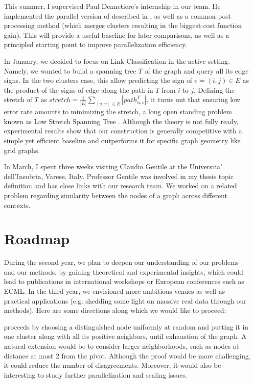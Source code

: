 This summer, I supervised Paul Dennetiere's internship in our team. He
implemented the parallel version of \kwik{} described in \autocite{Pan2014}, as
well as a common post processing method (which merges clusters resulting in the
biggest cost function gain). This will provide a useful baseline for later
comparisons, as well as a principled starting point to improve parallelization
efficiency.

\medskip

In January, we decided to focus on Link Classification in the active setting.
Namely, we wanted to build a spanning tree $T$ of the graph and query all its
edge signs. In the two clusters case, this allow predicting the sign of $e=(i,
j) \in E$ as the product of the signs of edge along the path in $T$ from $i$ to
$j$. Defining the stretch of $T$ as $stretch = \frac{1}{|E|} \sum_{(u,v) \in E}
|path^T_{u,v}|$, it turns out that ensuring low error rate amounts to
minimizing the stretch, a long open standing problem known as Low Stretch
Spanning Tree \autocite{Abraham2012}. Although the theory is not fully ready,
experimental results show that our construction is generally competitive with a
simple yet efficient baseline and outperforms it for specific graph geometry
like grid graphs.

In March, I spent three weeks visiting Claudio Gentile at the Universita'
dell'Insubria, Varese, Italy. Professor Gentile was involved in my thesis topic
definition and has close links with our research team. We worked on a related
problem regarding similarity between the nodes of a graph across different
contexts.

\section{Roadmap}\label{roadmap}

During the second year, we plan to deepen our understanding of our problems and
our methods, by gaining theoretical and experimental insights, which could lead
to publications in international workshops or European conferences such as
ECML. In the third year, we envisioned more ambitious venues as well as
practical applications (e.g. shedding some light on massive real data through
our methods). Here are some directions along which we would like to proceed:

\kwik{} proceeds by choosing a distinguished node uniformly at random and
putting it in one cluster along with all its positive neighbors, until
exhaustion of the graph. A natural extension would be to consider larger
neighborhoods, such as nodes at distance at most 2 from the pivot. Although the
proof would be more challenging, it could reduce the number of disagreements.
Moreover, it would also be interesting to study further parallelization and
scaling issues.

